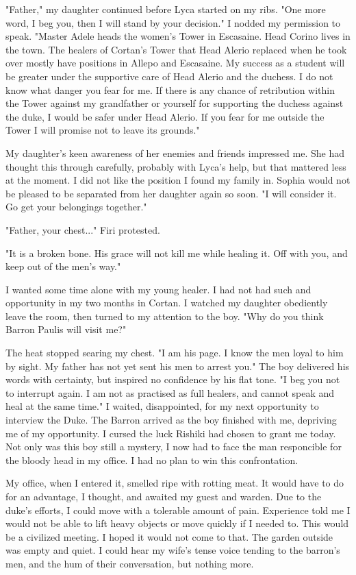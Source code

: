 \documentclass{article}
\begin{document}
"Father," my daughter continued before Lyca started on my ribs. "One more word, I beg you, then I will stand by your decision." I nodded my permission to speak. "Master Adele heads the women's Tower in Escasaine. Head Corino lives in the town. The healers of Cortan's Tower that Head Alerio replaced when he took over mostly have positions in Allepo and Escasaine. My success as a student will be greater under the supportive care of Head Alerio and the duchess. I do not know what danger you fear for me. If there is any chance of retribution within the Tower against my grandfather or yourself for supporting the duchess against the duke, I would be safer under Head Alerio. If you fear for me outside the Tower I will promise not to leave its grounds."

My daughter's keen awareness of her enemies and friends impressed me. She had thought this through carefully, probably with Lyca's help, but that mattered less at the moment. I did not like the position I found my family in. Sophia would not be pleased to be separated from her daughter again so soon. "I will consider it. Go get your belongings together." 

"Father, your chest..." Firi protested.

"It is a broken bone. His grace will not kill me while healing it. Off with you, and keep out of the men's way."

I wanted some time alone with my young healer. I had not had such and opportunity in my two months in Cortan. I watched my daughter obediently leave the room, then turned to my attention to the boy. "Why do you think Barron Paulis will visit me?"

The heat stopped searing my chest. "I am his page. I know the men loyal to him by sight. My father has not yet sent his men to arrest you." The boy delivered his words with certainty, but inspired no confidence by his flat tone. "I beg you not to interrupt again. I am not as practised as full healers, and cannot speak and heal at the same time." I waited, disappointed, for my next opportunity to interview the Duke. The Barron arrived as the boy finished with me, depriving me of my opportunity. I cursed the luck Rishiki had chosen to grant me today. Not only was this boy still a mystery, I now had to face the man responcible for the bloody head in my office. I had no plan to win this confrontation.

My office, when I entered it, smelled ripe with rotting meat. It would have to do for an advantage, I thought, and awaited my guest and warden.  Due to the duke's efforts, I could move with a tolerable amount of pain. Experience told me I would not be able to lift heavy objects or move quickly if I needed to. This would be a civilized meeting. I hoped it would not come to that. The garden outside was empty and quiet. I could hear my wife's tense voice tending to the barron's men, and the hum of their conversation, but nothing more.
\end{document}
